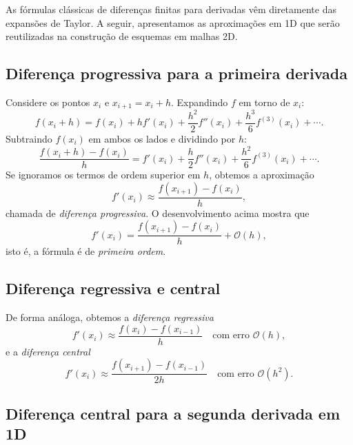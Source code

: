 As fórmulas clássicas de diferenças finitas para derivadas vêm diretamente 
das expansões de Taylor. A seguir, apresentamos as aproximações em 1D que 
serão reutilizadas na construção de esquemas em malhas 2D.

\subsection{Diferença progressiva para a primeira derivada}

Considere os pontos $x_i$ e $x_{i+1} = x_i + h$. Expandindo $f$ em torno 
de $x_i$:
\begin{equation}
    f(x_i + h) = f(x_i) + h f'(x_i) + \frac{h^2}{2} f''(x_i)
                 + \frac{h^3}{6} f^{(3)}(x_i) + \cdots.
\end{equation}
Subtraindo $f(x_i)$ em ambos os lados e dividindo por $h$:
\begin{equation}
    \frac{f(x_i + h) - f(x_i)}{h}
    = f'(x_i) + \frac{h}{2} f''(x_i) + \frac{h^2}{6} f^{(3)}(x_i) + \cdots.
\end{equation}
Se ignoramos os termos de ordem superior em $h$, obtemos a aproximação
\begin{equation}
    f'(x_i) \approx \frac{f(x_{i+1}) - f(x_i)}{h},
\end{equation}
chamada de \emph{diferença progressiva}. O desenvolvimento acima mostra que
\begin{equation}
    f'(x_i) = \frac{f(x_{i+1}) - f(x_i)}{h} + \mathcal{O}(h),
\end{equation}
isto é, a fórmula é de \emph{primeira ordem}.

\subsection{Diferença regressiva e central}

De forma análoga, obtemos a \emph{diferença regressiva}
\begin{equation}
    f'(x_i) \approx \frac{f(x_i) - f(x_{i-1})}{h}
    \quad \text{com erro } \mathcal{O}(h),
\end{equation}
e a \emph{diferença central}
\begin{equation}
    f'(x_i) \approx \frac{f(x_{i+1}) - f(x_{i-1})}{2h}
    \quad \text{com erro } \mathcal{O}(h^2).
\end{equation}

\subsection{Diferença central para a segunda derivada em 1D}

